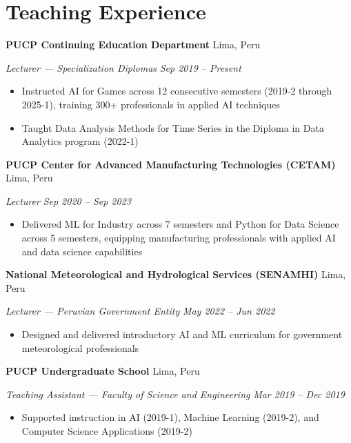 \documentclass[11pt,letterpaper]{article}
\newcommand{\entry}[4]{%
  \noindent\textbf{#1} \hfill #2 \par\nopagebreak
  \textit{#3} \hfill \textit{#4} \par\nopagebreak
}
\begin{document}
\section{Teaching Experience}

\entry{PUCP Continuing Education Department}{Lima, Peru}{Lecturer --- Specialization Diplomas}{Sep 2019 -- Present}
\begin{itemize}
  \item Instructed AI for Games across 12 consecutive semesters (2019-2 through 2025-1), training 300+ professionals in applied AI techniques
  \item Taught Data Analysis Methods for Time Series in the Diploma in Data Analytics program (2022-1)
\end{itemize}
\vspace{0.3em}

\entry{PUCP Center for Advanced Manufacturing Technologies (CETAM)}{Lima, Peru}{Lecturer}{Sep 2020 -- Sep 2023}
\begin{itemize}
  \item Delivered ML for Industry across 7 semesters and Python for Data Science across 5 semesters, equipping manufacturing professionals with applied AI and data science capabilities
\end{itemize}
\vspace{0.3em}

\entry{National Meteorological and Hydrological Services (SENAMHI)}{Lima, Peru}{Lecturer --- Peruvian Government Entity}{May 2022 -- Jun 2022}
\begin{itemize}
  \item Designed and delivered introductory AI and ML curriculum for government meteorological professionals
\end{itemize}
\vspace{0.3em}

\entry{PUCP Undergraduate School}{Lima, Peru}{Teaching Assistant --- Faculty of Science and Engineering}{Mar 2019 -- Dec 2019}
\begin{itemize}
  \item Supported instruction in AI (2019-1), Machine Learning (2019-2), and Computer Science Applications (2019-2)
\end{itemize}
\vspace{0.3em}

\end{document}
